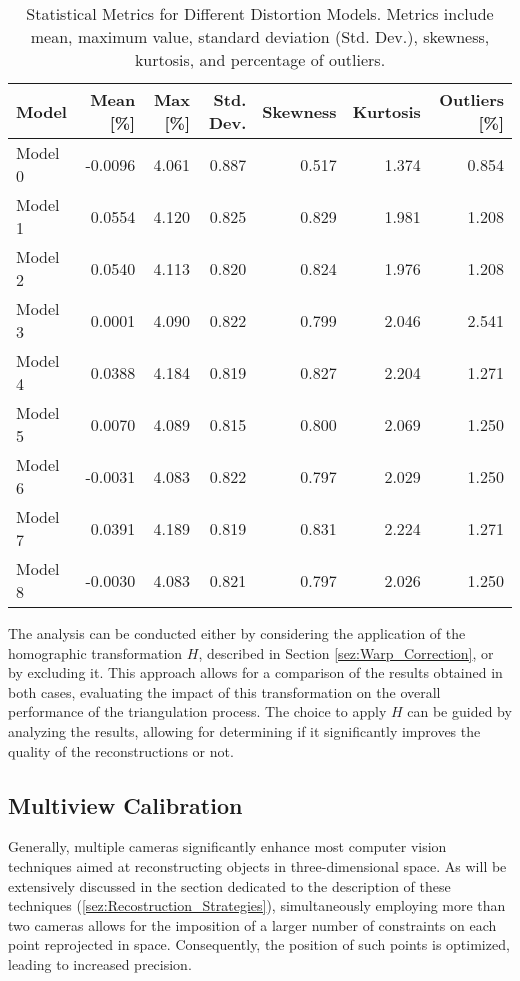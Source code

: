 \begin{table}[h!]
  \centering
  \small
  \begin{tabular}{lrrrrrr}
    \toprule
    Model   & Mean [\%] & Max [\%] & Std. Dev. & Skewness & Kurtosis & Outliers [\%] \\
    \midrule
    Model 0 & -0.0096   & 4.061    & 0.887     & 0.517    & 1.374    & 0.854 \\
    Model 1 &  0.0554   & 4.120    & 0.825     & 0.829    & 1.981    & 1.208 \\
    Model 2 &  0.0540   & 4.113    & 0.820     & 0.824    & 1.976    & 1.208 \\
    Model 3 &  0.0001   & 4.090    & 0.822     & 0.799    & 2.046    & 2.541 \\
    Model 4 &  0.0388   & 4.184    & 0.819     & 0.827    & 2.204    & 1.271 \\
    Model 5 &  0.0070   & 4.089    & 0.815     & 0.800    & 2.069    & 1.250 \\
    Model 6 & -0.0031   & 4.083    & 0.822     & 0.797    & 2.029    & 1.250 \\
    Model 7 &  0.0391   & 4.189    & 0.819     & 0.831    & 2.224    & 1.271 \\
    Model 8 & -0.0030   & 4.083    & 0.821     & 0.797    & 2.026    & 1.250 \\
    \bottomrule
  \end{tabular}
  \caption{Statistical Metrics for Different Distortion Models. Metrics include mean, maximum value, standard deviation (Std. Dev.), skewness, kurtosis, and percentage of outliers.}
  \label{tab:stereoMetrix}
\end{table}

The analysis can be conducted either by considering the application of the homographic transformation $H$, described in Section \ref{sez:Warp_Correction}, or by excluding it. This approach allows for a comparison of the results obtained in both cases, evaluating the impact of this transformation on the overall performance of the triangulation process. The choice to apply $H$ can be guided by analyzing the results, allowing for determining if it significantly improves the quality of the reconstructions or not.

\subsection{Multiview Calibration}
\label{sez:multiview_calibration}

Generally, multiple cameras significantly enhance most computer vision techniques aimed at reconstructing objects in three-dimensional space. As will be extensively discussed in the section dedicated to the description of these techniques (\textsection\ref{sez:Recostruction_Strategies}), simultaneously employing more than two cameras allows for the imposition of a larger number of constraints on each point reprojected in space. Consequently, the position of such points is optimized, leading to increased precision.  

